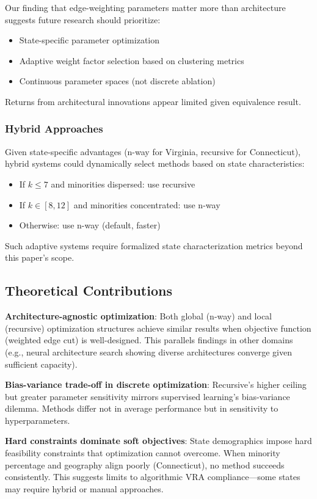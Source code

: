 Our finding that edge-weighting parameters matter more than architecture suggests future research should prioritize:
\begin{itemize}
\item State-specific parameter optimization
\item Adaptive weight factor selection based on clustering metrics
\item Continuous parameter spaces (not discrete ablation)
\end{itemize}

Returns from architectural innovations appear limited given equivalence result.

\subsubsection{Hybrid Approaches}

Given state-specific advantages (n-way for Virginia, recursive for Connecticut), hybrid systems could dynamically select methods based on state characteristics:
\begin{itemize}
\item If $k \leq 7$ and minorities dispersed: use recursive
\item If $k \in [8,12]$ and minorities concentrated: use n-way
\item Otherwise: use n-way (default, faster)
\end{itemize}

Such adaptive systems require formalized state characterization metrics beyond this paper's scope.

\subsection{Theoretical Contributions}

\textbf{Architecture-agnostic optimization}: Both global (n-way) and local (recursive) optimization structures achieve similar results when objective function (weighted edge cut) is well-designed. This parallels findings in other domains (e.g., neural architecture search showing diverse architectures converge given sufficient capacity).

\textbf{Bias-variance trade-off in discrete optimization}: Recursive's higher ceiling but greater parameter sensitivity mirrors supervised learning's bias-variance dilemma. Methods differ not in average performance but in sensitivity to hyperparameters.

\textbf{Hard constraints dominate soft objectives}: State demographics impose hard feasibility constraints that optimization cannot overcome. When minority percentage and geography align poorly (Connecticut), no method succeeds consistently. This suggests limits to algorithmic VRA compliance—some states may require hybrid or manual approaches.
